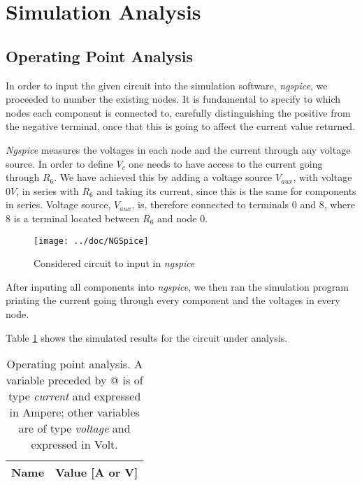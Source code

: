 \section{Simulation Analysis}
\label{sec:simulation}

\subsection{Operating Point Analysis}

In order to input the given circuit into the simulation software, \emph{ngspice}, we proceeded to number the existing nodes. It is fundamental to specify to which nodes each component is connected to, carefully distinguishing the positive from the negative terminal, once that this is going to affect the current value returned.

\emph{Ngspice} measures the voltages in each node and the current through any voltage source. In order to define $V_c$ one needs to have access to the current going through $R_6$. We have achieved this by adding a voltage source $V_{aux}$, with voltage $0V$, in series with $R_6$ and taking its current, since this is the same for components in series. Voltage source, $V_{aux}$, is, therefore connected to terminals 0 and 8, where 8 is a terminal located between $R_6$ and node 0.

\begin{figure}[H]
  \centering
  \texttt{[image: ../doc/NGSpice]}
  \caption{Considered circuit to input in \emph{ngspice}}
  \label{fig:fignodos}
\end{figure}

After inputing all components into \emph{ngspice}, we then ran the simulation program printing the current going through every component and the voltages in every node.


Table \ref{tab:ngspice} shows the simulated results for the circuit
under analysis.

\begin{table}[H]
  \centering
  \begin{tabular}{|l|r|}
    \hline
    {\bf Name} & {\bf Value [A or V]} \\ \hline
    
  \end{tabular}
  \caption{Operating point analysis. A variable preceded by @ is of type {\em current}
    and expressed in Ampere; other variables are of type {\it voltage} and expressed in
    Volt.}
  \label{tab:ngspice}
\end{table}

